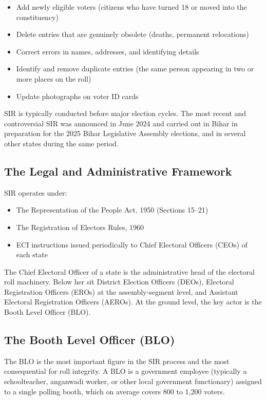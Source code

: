 \documentclass[11pt, a4paper]{article}
\begin{document}
\begin{itemize}[leftmargin=1.5em, itemsep=4pt]
  \item Add newly eligible voters (citizens who have turned 18 or moved into the constituency)
  \item Delete entries that are genuinely obsolete (deaths, permanent relocations)
  \item Correct errors in names, addresses, and identifying details
  \item Identify and remove duplicate entries (the same person appearing in two or more places on the roll)
  \item Update photographs on voter ID cards
\end{itemize}

SIR is typically conducted before major election cycles. The most recent and controversial SIR was announced in June 2024 and carried out in Bihar in preparation for the 2025 Bihar Legislative Assembly elections, and in several other states during the same period.

\subsection{The Legal and Administrative Framework}

SIR operates under:

\begin{itemize}[leftmargin=1.5em, itemsep=3pt]
  \item The Representation of the People Act, 1950 (Sections 15--21)
  \item The Registration of Electors Rules, 1960
  \item ECI instructions issued periodically to Chief Electoral Officers (CEOs) of each state
\end{itemize}

The Chief Electoral Officer of a state is the administrative head of the electoral roll machinery. Below her sit District Election Officers (DEOs), Electoral Registration Officers (EROs) at the assembly-segment level, and Assistant Electoral Registration Officers (AEROs). At the ground level, the key actor is the Booth Level Officer (BLO).

\subsection{The Booth Level Officer (BLO)}

The BLO is the most important figure in the SIR process and the most consequential for roll integrity. A BLO is a government employee (typically a schoolteacher, anganwadi worker, or other local government functionary) assigned to a single polling booth, which on average covers 800 to 1,200 voters.
\end{document}
